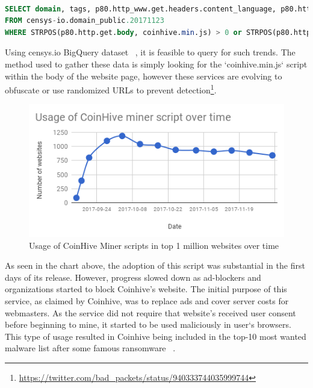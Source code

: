\begin{lstlisting}[caption={BigQuery SQL query to find websites using coinhive miner script using censys.io datasets},label={lst:bigquery},language=sql,linewidth=\linewidth]

SELECT domain, tags, p80.http_www.get.headers.content_language, p80.http_www.get.headers.server, p80.http.get.headers.x_powered_by, p80.http.get.title, p80.http_www.get.body as wwwbody, p80.http.get.body as plainbody 
FROM censys-io.domain_public.20171123
WHERE STRPOS(p80.http.get.body, coinhive.min.js) > 0 or STRPOS(p80.http_www.get.body, coinhive.min.js) >0)

\end{lstlisting}

Using censys.io BigQuery dataset ~\cite{censys15}, it is feasible to query for such trends. The method used to gather these data is simply looking for the `coinhive.min.js` script within the body of the website page, however these services are evolving to obfuscate or use randomized URLs to prevent detection\footnote{\url{https://twitter.com/bad_packets/status/940333744035999744}}.

\begin{figure}[t]
\centering
\includegraphics[width=\linewidth]{figures/usage_of_coinhive_over_time.png}
\caption{Usage of CoinHive Miner scripts in top 1 million websites over time}
\end{figure}


As seen in the chart above, the adoption of this script was substantial in the first days of its release. However, progress slowed down as ad-blockers and organizations started to block Coinhive's website. The initial purpose of this service, as claimed by Coinhive, was to replace ads and cover server costs for webmasters. As the service did not require that website's received user consent before beginning to mine, it started to be used maliciously in user`s browsers. This type of usage resulted in Coinhive being included in the top-10 most wanted malware list after some famous ransomware ~\cite{checkpoint}. 

